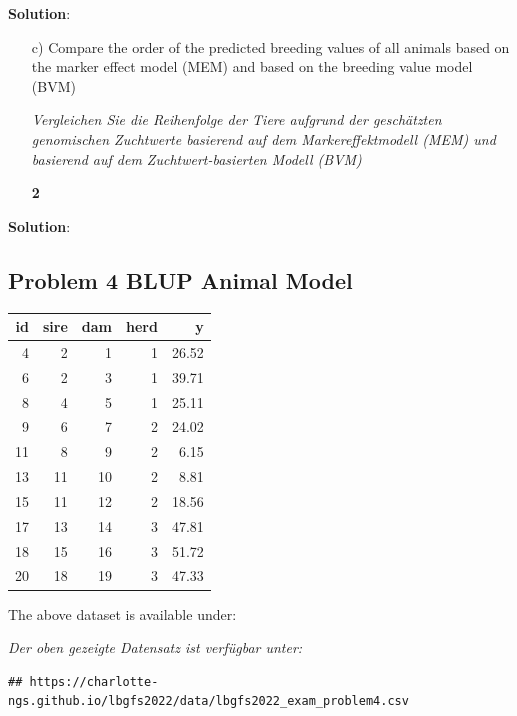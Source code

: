 \documentclass[
]{article}
\newcommand{\points}[1]
{\begin{flushright}\textbf{#1}\end{flushright}}
\newcommand{\solstart}
{\vspace{3ex}\textbf{Solution}:}
\begin{document}
\solstart

\clearpage
\pagebreak

\vspace{3ex}
\begin{enumerate}
\item[c)]  Compare the order of the predicted breeding values of all animals based on the marker effect model (MEM) and based on the breeding value model (BVM)

\textit{Vergleichen Sie die Reihenfolge der Tiere aufgrund der geschätzten genomischen Zuchtwerte basierend auf dem Markereffektmodell (MEM) und basierend auf dem Zuchtwert-basierten Modell (BVM)}
\points{2}
\end{enumerate}

\solstart

\clearpage
\pagebreak

\hypertarget{problem-4-blup-animal-model}{%
\subsection{Problem 4 BLUP Animal
Model}\label{problem-4-blup-animal-model}}

\begin{longtable}[]{@{}rrrrr@{}}
\toprule()
id & sire & dam & herd & y \\
\midrule()
\endhead
4 & 2 & 1 & 1 & 26.52 \\
6 & 2 & 3 & 1 & 39.71 \\
8 & 4 & 5 & 1 & 25.11 \\
9 & 6 & 7 & 2 & 24.02 \\
11 & 8 & 9 & 2 & 6.15 \\
13 & 11 & 10 & 2 & 8.81 \\
15 & 11 & 12 & 2 & 18.56 \\
17 & 13 & 14 & 3 & 47.81 \\
18 & 15 & 16 & 3 & 51.72 \\
20 & 18 & 19 & 3 & 47.33 \\
\bottomrule()
\end{longtable}

The above dataset is available under:

\textit{Der oben gezeigte Datensatz ist verfügbar unter:}

\begin{verbatim}
## https://charlotte-ngs.github.io/lbgfs2022/data/lbgfs2022_exam_problem4.csv
\end{verbatim}
\end{document}
